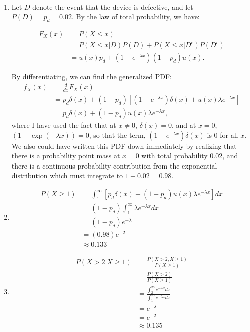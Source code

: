 \begin{problem}{16} $ $

\begin{enumerate}
\item Let $D$ denote the event that the device is defective, and let $P(D) = p_d = 0.02$.  By the law of total probability, we have:

\begin{align*}
F_X(x) &= P(X \le x) \\
&= P(X \le x|D)P(D)+ P(X \le x|D^c)P(D^c)\\
&= u(x)p_d+(1-e^{-\lambda x})(1-p_d)u(x).
\end{align*}

By differentiating, we can find the generalized PDF:
\begin{align*}
f_X(x) &= \frac{d}{dx} F_X(x) \\
&= p_d \delta(x) +(1-p_d)\left[(1-e^{-\lambda x}) \delta(x) +u(x) \lambda e^{-\lambda x} \right] \\
& =p_d \delta(x) +(1-p_d)u(x) \lambda e^{-\lambda x},
\end{align*}
where I have used the fact that at $x \ne 0$, $\delta(x)=0$, and at $x=0$, $(1-\exp{(-\lambda x)})=0$, so that the term, $(1-e^{-\lambda x}) \delta(x)$ is 0 for all $x$.  We also could have written this PDF down immediately by realizing that there is a probability point mass at $x=0$ with total probability $0.02$, and there is a continuous probability contribution from the exponential distribution which must integrate to $1-0.02=0.98$.

\item

\begin{align*}
P(X \ge 1) &= \int_1^{\infty}\left [p_d \delta(x)+(1-p_d)u(x)\lambda e^{-\lambda x} \right] dx \\
& = (1-p_d)\int_1^{\infty}\lambda e^{-\lambda x}dx \\
& = (1-p_d)e^{-\lambda} \\
& = (0.98)e^{-2} \\
& \approx 0.133
\end{align*}

\item
\begin{align*}
P(X >2| X \ge 1) &= \frac{P(X >2,X\ge 1) }{P(X \ge 1) }  \\
&= \frac{P(X >2) }{P(X \ge 1) } \\
&= \frac{\int_2^{\infty}e^{-\lambda x}dx}{\int_1^{\infty}e^{-\lambda x}dx} \\
& = e^{-\lambda} \\
& = e^{-2} \\
& \approx 0.135
\end{align*}


\end{enumerate}
\end{problem}
